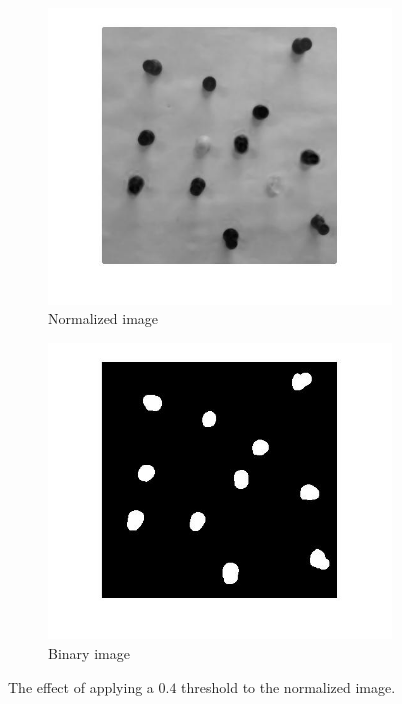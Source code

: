 \documentclass[12pt]{article}
\begin{document}
\begin{figure}
    \begin{subfigure}{.5\textwidth}
        \centering
        \includegraphics[width=\linewidth]{pins_norm}
        \caption{Normalized image}
    \end{subfigure}\hfill
    \begin{subfigure}{.5\textwidth}
        \centering
        \includegraphics[width=\linewidth]{pins_bw}
        \caption{Binary image}
    \end{subfigure}
    \caption{The effect of applying a ${0.4}$ threshold to the normalized image.}
    \label{fig_bw}
\end{figure}
\end{document}
